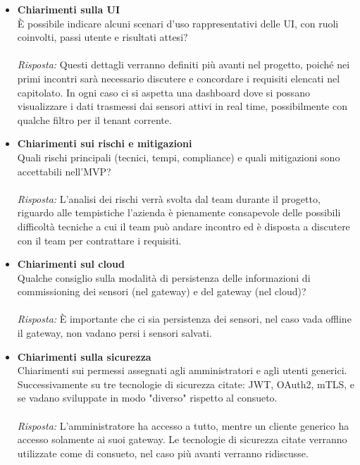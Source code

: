 \documentclass[a4paper,12pt]{article}
\begin{document}
\begin{itemize}
    \item \textbf{Chiarimenti sulla UI}\\
    \noindent
    È possibile indicare alcuni scenari d'uso rappresentativi delle UI, con ruoli coinvolti, passi utente e risultati attesi?\\ \\
    \textit{Risposta:} 
    Questi dettagli verranno definiti più avanti nel progetto, poiché nei primi incontri sarà necessario discutere e concordare i requisiti elencati nel capitolato. In ogni caso ci si aspetta una dashboard dove si possano visualizzare i dati trasmessi dai sensori attivi in real time, possibilmente con qualche filtro per il tenant corrente.
    \vspace{1cm}

    \item \textbf{Chiarimenti sui rischi e mitigazioni}\\
    \noindent
    Quali rischi principali (tecnici, tempi, compliance) e quali mitigazioni sono accettabili nell'MVP? \\ \\
    \textit{Risposta:} 
    L'analisi dei rischi verrà svolta dal team durante il progetto, riguardo alle tempistiche l'azienda è pienamente consapevole delle possibili difficoltà tecniche a cui il team può andare incontro ed è disposta a discutere con il team per contrattare i requisiti.
    \vspace{1cm}
    
    \item \textbf{Chiarimenti sul cloud}\\
    \noindent
    Qualche consiglio sulla modalità di persistenza delle informazioni di commissioning dei sensori (nel gateway) e del gateway (nel cloud)? \\ \\
    \textit{Risposta:} 
    È importante che ci sia persistenza dei sensori, nel caso vada offline il gateway, non vadano persi i sensori salvati.
    \vspace{1cm}
    
    \item \textbf{Chiarimenti sulla sicurezza}\\
    \noindent
    Chiarimenti sui permessi assegnati agli amministratori e agli utenti generici. Successivamente su tre tecnologie di sicurezza citate: JWT, OAuth2, mTLS, e se vadano sviluppate in modo "diverso" rispetto al consueto.\\ \\
    \textit{Risposta:} 
    L'amministratore ha accesso a tutto, mentre un cliente generico ha accesso solamente ai suoi gateway.
    Le tecnologie di sicurezza citate verranno utilizzate come di consueto, nel caso più avanti verranno ridiscusse.
    \vspace{1cm}
    
\end{itemize}
\end{document}
